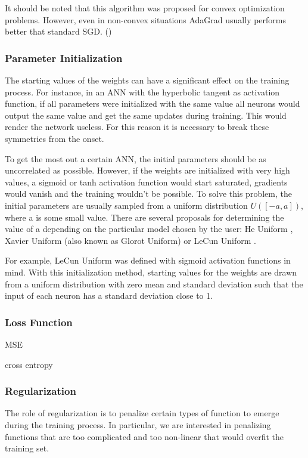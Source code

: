 It should be noted that this algorithm was proposed for convex optimization problems. However, even in non-convex situations AdaGrad usually performs better that standard SGD. (\cite{gupta2014training})

\subsubsection{Parameter Initialization}

The starting values of the weights can have a significant effect on the training process. For instance, in an ANN with the hyperbolic tangent as activation function, if all parameters were initialized with the same value all neurons would output the same value and get the same updates during training. This would render the network useless. For this reason it is necessary to break these symmetries from the onset.

To get the most out a certain ANN, the initial parameters should be as  uncorrelated as possible. However, if the weights are initialized with very high values, a sigmoid or tanh activation function would start saturated, gradients would vanish and the training wouldn't be possible.
To solve this problem, the initial parameters are usually  sampled from a uniform distribution $U([-a,a])$, where a is some small value. There are several proposals for determining the value of a depending on the particular model chosen by the user: He Uniform \cite{he2015delving}, Xavier Uniform \cite{glorot2010understanding} (also known as Glorot Uniform) or LeCun Uniform \cite{lecun2012efficient}.

For example, LeCun Uniform was defined with sigmoid activation functions in mind. With this initialization method, starting values for the weights are drawn from a uniform distribution with zero mean and standard deviation such that the input of each neuron has a standard deviation close to 1.

\subsubsection{Loss Function}
\label{subsubsec:loss-function}
MSE

cross entropy

\subsubsection{Regularization}
The role of regularization is to penalize certain types of function to emerge during the training process. In particular, we are interested in penalizing functions that are too complicated and too non-linear that would overfit the training set.

